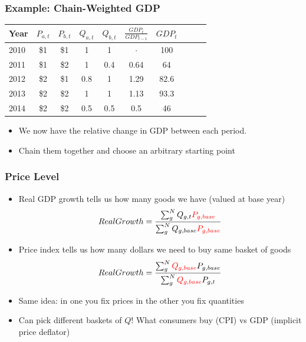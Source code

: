 \documentclass{beamer}
\begin{document}
  
    \begin{frame}
\frametitle[alignment=center]{Example: Chain-Weighted GDP}
\small
\begin{table}
\centering
\begin{tabular}{lccccccccc}
Year & $P_{a,t}$ & $P_{b,t}$ & $Q_{a,t}$ & $Q_{b,t}$ & $\frac{GDP_t}{GDP_{t-1}}$ & $GDP_t$\\
\hline
2010 & \$1 & \$1 & 1 & 1 & $\cdot$ & 100\\
2011 & \$1 & \$2 & 1 & 0.4 & 0.64 & 64\\
2012 & \$2 & \$1 & 0.8 & 1  & 1.29 & 82.6\\
2013 & \$2 & \$2 & 1 & 1  & 1.13 & 93.3\\
2014 & \$2 & \$2 & 0.5 & 0.5 & 0.5 & 46\\
\end{tabular}
\end{table}
\begin{itemize}
\item We now have the relative change in GDP between each period.
\item Chain them together and choose an arbitrary starting point 
\end{itemize}
\end{frame}

    \begin{frame}
\frametitle[alignment=center]{Price Level}
\begin{itemize}
\item Real GDP growth tells us how many goods we have (valued at base year)
$$Real Growth=\frac{\sum_{g}^NQ_{g,t}\textcolor{red}{P_{g,base}}}{\sum_{g}^NQ_{g,base}\textcolor{red}{P_{g,base}}}$$
\item Price index tells us how many dollars we need to buy same basket of goods
$$Real Growth=\frac{\sum_{g}^N\textcolor{red}{Q_{g,base}}P_{g,base}}{\sum_{g}^N\textcolor{red}{Q_{g,base}}P_{g,t}}$$
\item Same idea:  in one you fix prices in the other you fix quantities 
\item Can pick different baskets of $Q$!  What consumers buy (CPI) vs GDP (implicit price deflator)
\end{itemize}
\end{frame}
\end{document}
